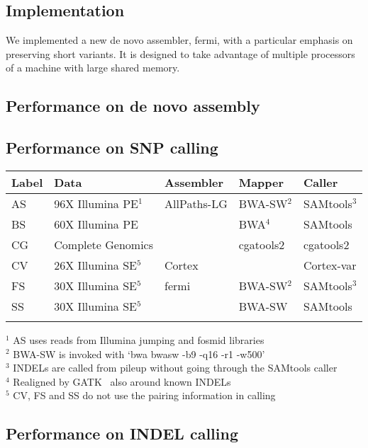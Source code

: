 \documentclass{bioinfo}
\begin{document}
\subsection{Implementation}
We implemented a new de novo assembler, fermi, with a particular emphasis on
preserving short variants. It is designed to take advantage of multiple
processors of a machine with large shared memory.

\subsection{Performance on de novo assembly}

\subsection{Performance on SNP calling}

\begin{table}[!htb]
{\begin{tabular}{lllll}
\toprule
Label & Data & Assembler & Mapper & Caller \\
\midrule
AS & 96X Illumina PE$^1$ & AllPaths-LG & BWA-SW$^2$ & SAMtools$^3$ \\
BS & 60X Illumina PE & & BWA$^4$ & SAMtools \\
CG & Complete Genomics& & cgatools2 & cgatools2 \\
CV & 26X Illumina SE$^5$ & Cortex & & Cortex-var \\
FS & 30X Illumina SE$^5$ & fermi & BWA-SW$^2$ & SAMtools$^3$ \\
SS & 30X Illumina SE$^5$ & & BWA-SW & SAMtools \\
\botrule
\end{tabular}}{
$^1$ AS uses reads from Illumina jumping and fosmid libraries\\
$^2$ BWA-SW is invoked with `bwa bwasw -b9 -q16 -r1 -w500'\\
$^3$ INDELs are called from pileup without going through the SAMtools caller\\
$^4$ Realigned by GATK~\citep{Depristo:2011vn} also around known INDELs\\
$^5$ CV, FS and SS do not use the pairing information in calling\\
}
\end{table}

\subsection{Performance on INDEL calling}
\end{document}
